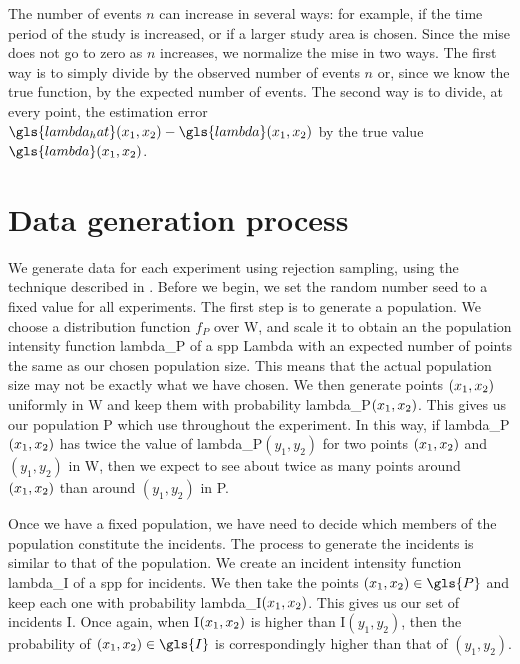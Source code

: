 The number of events $n$ can increase in several ways: for example, if the time period of the study is increased,
or if a larger study area is chosen.
Since the \gls{mise} does not go to zero as $n$ increases,
we normalize the \gls{mise} in two ways.
The first way is to simply divide by the observed number of events $n$ or,
since we know the true function,
by the expected number of events.
The second way is to divide, at every point,
the estimation error $\gls{lambda_hat}\xvec - \gls{lambda}\xvec$ by the true value $\gls{lambda}\xvec$.


\section{Data generation process}
\label{sec:theory:data}

We generate data for each experiment using rejection sampling,
using the technique described in \citet{diggle1983spatial}.
Before we begin, we set the random number seed to a fixed value for all experiments.
The first step is to generate a population.
We choose a distribution function $f_P$ over \gls{W},
and scale it to obtain an the population intensity function \gls{lambda_P} of a \gls{spp} \gls{Lambda} with an expected number of points the same as our chosen population size.
This means that the actual population size may not be exactly what we have chosen.
We then generate points $(x_1, x_2)$ uniformly in \gls{W} and keep them with probability \gls{lambda_P}$(x_1, x_2)$.
This gives us our population \gls{P} which use throughout the experiment.
In this way,
if \gls{lambda_P}$(x_1, x_2)$ has twice the value of \gls{lambda_P}$(y_1, y_2)$ for two points $(x_1, x_2)$ and $(y_1, y_2)$ in \gls{W},
then we expect to see about twice as many points around $(x_1, x_2)$ than around $(y_1, y_2)$ in \gls{P}.

Once we have a fixed population, we have need to decide which members of the population constitute the incidents.
The process to generate the incidents is similar to that of the population.
We create an incident intensity function \gls{lambda_I} of a \gls{spp} for incidents.
We then take the points $\xvec \in \gls{P}$ and keep each one with probability \gls{lambda_I}$(x_1, x_2)$.
This gives us our set of incidents \gls{I}.
Once again, when \gls{I}$(x_1, x_2)$ is higher than \gls{I}$(y_1, y_2)$,
then the probability of $\xvec \in \gls{I}$ is correspondingly higher than that of $(y_1, y_2)$.


